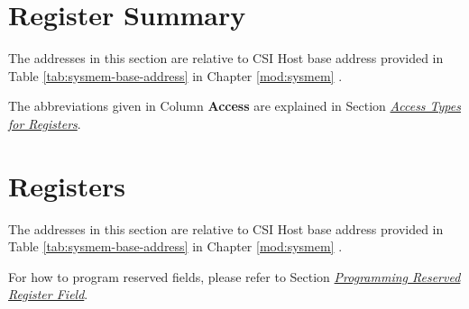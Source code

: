 \documentclass[main\_\_EN.tex]{subfiles}
\begin{document}



\newpage
\begin{landscape}

\hypertarget{mipicsi-reg-summ}{}
\section{Register Summary}
\label{sec:mipicsi-reg-summ}

The addresses in this section are relative to CSI Host base address provided in Table \ref{tab:sysmem-base-address} in Chapter \ref{mod:sysmem} \textit{}.

The abbreviations given in Column \textbf{Access} are explained in Section \hyperref[glossary-access-types]{\textit{Access Types for Registers}}.



\end{landscape}





\newpage
\section{Registers}


The addresses in this section are relative to CSI Host base address provided in Table \ref{tab:sysmem-base-address} in Chapter \ref{mod:sysmem} \textit{}.

For how to program reserved fields, please refer to Section \hyperref[programming-reserved-field]{\textit{Programming Reserved Register Field}}.


\end{document}
